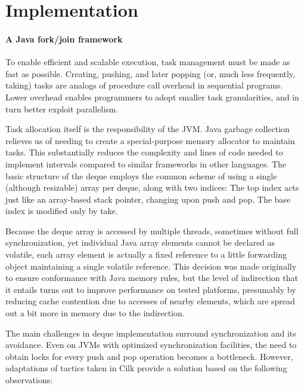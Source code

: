 
\chapter{Implementation}
\label{chap:queues-implementation}


\subsubsection{A Java fork/join framework \cite{Lea2000}}


To enable efficient and scalable execution, task management must be
made as fast as possible. Creating, pushing, and later popping (or,
much less frequently, taking) tasks are analogs of procedure call
overhead in sequential programs. Lower overhead enables programmers to
adopt smaller task granularities, and in turn better exploit
parallelism.

Task allocation itself is the responsibility of the JVM. Java garbage
collection relieves us of needing to create a special-purpose memory
allocator to maintain tasks. This substantially reduces the complexity
and lines of code needed to implement intervals compared to similar
frameworks in other languages. The basic structure of the deque
employs the common scheme of using a single (although resizable) array
per deque, along with two indices: The top index acts just like an
array-based stack pointer, changing upon push and pop. The base index
is modified only by take.

Because the deque array is accessed by multiple threads, sometimes
without full synchronization, yet individual Java array elements
cannot be declared as volatile, each array element is actually a fixed
reference to a little forwarding object maintaining a single volatile
reference. This decision was made originally to ensure conformance
with Java memory rules, but the level of indirection that it entails
turns out to improve performance on tested platforms, presumably by
reducing cache contention due to accesses of nearby elements, which
are spread out a bit more in memory due to the indirection.

The main challenges in deque implementation surround synchronization
and its avoidance. Even on JVMs with optimized synchronization
facilities, the need to obtain locks for every push and pop operation
becomes a bottleneck.  However, adaptations of tactics taken in Cilk
\cite{Frigo1998} provide a solution based on the following
observations:

